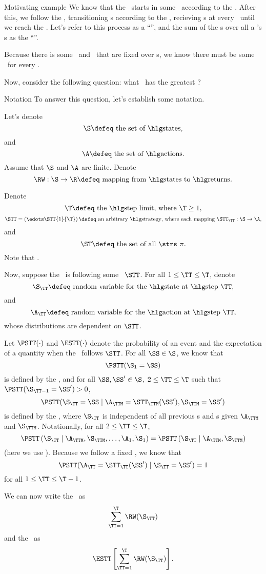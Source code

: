 \documentclass{rl_theory}
\begin{document}
\begin{part} {Motivating example}
  We know that the \agt\ starts in some \til\ according to the \ind.
  After this, we follow the \str, 
  transitioning \til{}s according to the \trd, recieving \rwd{}s 
  at every \til\ until
  we reach the \lmt. Let's refer to this process as a ``\run'', and
  the sum of the \rwd{}s over all a \run's \til{}s
  as the ``\trwd''.

  Because there is some \ind\ and \trd\ 
  that are fixed over \run{}s, 
  we know there must be 
  some \atrwd\ for every \str.

  Now, consider the following question: 
  what \str\ has the greatest \atrwd?
\end{part}

\newpage
\begin{part}{Notation}
  To answer this question, let's establish some notation.

  Let's denote
  $$\text{$\S \defeq$ the set of \til{}s},$$
  and 
  $$\text{$\A \defeq$ the set of \act{}s.}$$
  Assume that $\S$ and $\A$ are finite.
  Denote
  $$\text{$\RW : \S \rightarrow \R \defeq$ mapping from \til{}s to \rwd{}s.}$$

  Denote
  $$\text{$\T \defeq$ the \lmt, where $\T \ge 1$},$$
  $$\text{$\STT = \left(\edots\STT{1}{\T}\right) \defeq$ an arbitrary \str, 
  where each mapping $\STT_\TT : \S \rightarrow \A$},$$
  and
  $$\text{$\ST \defeq$ the set of all \strs\ $\pi$}.$$
  Note that .

  Now, suppose the \agt\ is following some \str\ $\STT$.
  For all $1 \le \TT \le \T$,
  denote
  $$\text{$\S_\TT \defeq$ random variable for the \til\ at \stp\ $\TT$},$$
  and
  $$\text{$\A_\TT \defeq$ random variable for the \act\ at \stp\ $\TT$},$$
  whose distributions are dependent on $\STT$.

  Let $\PSTT(\cdot)$ and $\ESTT(\cdot)$ denote the probability of an event
  and the expectation of a quantity
  when the \agt\ follows $\STT$.
  For all $\SS \in \S$, we know that
  $$\PSTT(\S_1 = \SS)$$
  is defined by the \ind, and
  for all $\SS, \SS' \in \S$, $2 \le \TT \le \T$ such that 
  $\PSTT(\S_{\TT - 1} = \SS') > 0$,
  $$\PSTT(\S_\TT = \SS \mid \A_\TTM = \STT_\TTM(\SS'), \S_\TTM = \SS')$$
  is defined by the \trd, where 
  $\S_\TT$ is independent of all previous \til{}s and \act{}s given $\A_\TTM$ and $\S_\TTM$.
  Notationally, for all $2 \le \TT \le \T$,
  $$ 
  \PSTT\left( \S_\TT \mid \A_{\TTM}, \S_{\TTM}, \ldots, \A_{1}, \S_{1} \right)
  = 
  \PSTT\left( \S_\TT \mid \A_{\TTM}, \S_{\TTM}\right)
  $$
  (here we use ).
  Because we follow a fixed \str, we know that
  $$\PSTT(\A_\TT = \STT_\TT(\SS') \mid \S_\TT = \SS') = 1$$
  for all
  $1 \le \TT \le \T - 1$.

  We can now write the \trwd\ as
  $$\sum_{\TT = 1}^\T \RW(\S_\TT)$$
  and the \atrwd\ as
  $$\ESTT\left[\sum_{\TT = 1}^\T \RW(\S_\TT)\right].$$
\end{part}
\end{document}
